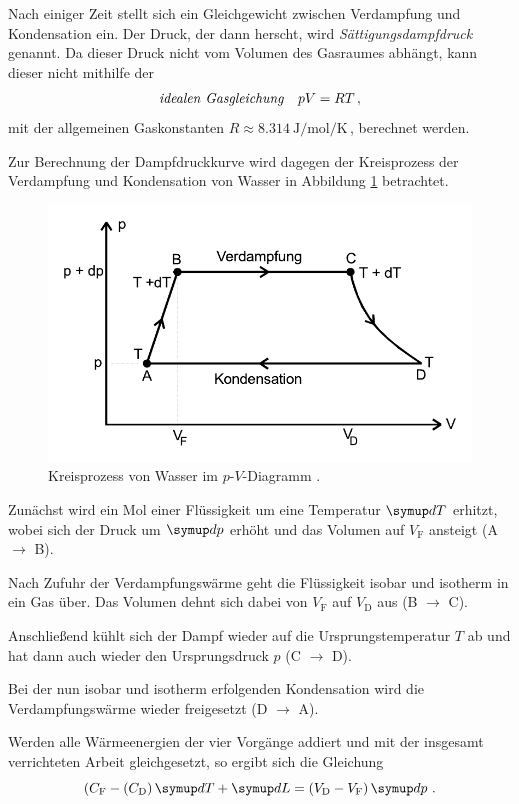 Nach einiger Zeit stellt sich ein Gleichgewicht zwischen Verdampfung und Kondensation ein. 
Der Druck, der dann herscht, wird \textit{Sättigungsdampfdruck} genannt.
Da dieser Druck nicht vom Volumen des Gasraumes abhängt, kann dieser nicht mithilfe der
\begin{equation}
    \text{\textit{idealen~Gasgleichung}} \quad pV = RT  \, , \label{eq:idgasgleichung} 
\end{equation}
mit der allgemeinen Gaskonstanten $ R \approx \qty[per-mode=reciprocal]{8.314}{\joule\per\mol\per\kelvin} \,$, berechnet werden.

Zur Berechnung der Dampfdruckkurve wird dagegen der Kreisprozess der Verdampfung und Kondensation von Wasser
in Abbildung \ref{fig:kreisprozess} betrachtet.
\begin{figure} 
    \centering
    \includegraphics[width=12cm] {pictures/kreisprozess.pdf}  
    \caption{Kreisprozess von Wasser im $p$-$V$-Diagramm \cite[3]{v203}.}
    \label{fig:kreisprozess}
\end{figure}

Zunächst wird ein Mol einer Flüssigkeit um eine Temperatur $\dif{T}$ erhitzt, 
wobei sich der Druck um $\dif{p}$ erhöht und das Volumen auf $V_{\text{F}}$ ansteigt (A $\to$ B). 

Nach Zufuhr der Verdampfungswärme geht die Flüssigkeit isobar und isotherm in ein Gas über.
Das Volumen dehnt sich dabei von $V_{\text{F}}$ auf $V_{\text{D}}$ aus (B $\to$ C). 

Anschließend kühlt sich der Dampf wieder auf die Ursprungstemperatur $T$ ab 
und hat dann auch wieder den Ursprungsdruck $p$ (C $\to$ D).

Bei der nun isobar und isotherm erfolgenden Kondensation wird die Verdampfungswärme wieder freigesetzt (D $\to$ A).

Werden alle Wärmeenergien der vier Vorgänge addiert und mit der insgesamt verrichteten Arbeit gleichgesetzt,
so ergibt sich die Gleichung
\begin{equation}
    (C_\text{F} - (C_\text{D}) \dif{T} + \dif{L} = (V_\text{D} - V_\text{F}) \dif{p} \, .
\end{equation}

